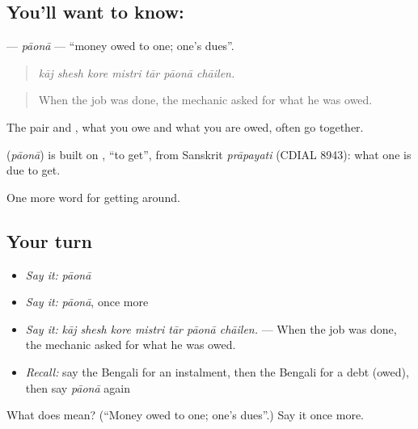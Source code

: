 \subsection*{You'll want to know: }
\textbf{} — \emph{pāonā} — \textquotedblleft{}money owed to one; one's dues\textquotedblright{}.

\begin{quote}
      
\end{quote}

\begin{quote}
\emph{kāj shesh kore mistri tār pāonā chāilen.}
\end{quote}

\begin{quote}
When the job was done, the mechanic asked for what he was owed.
\end{quote}

The pair  and , what you owe and what you are owed, often go together.

\begin{cousinweb}
\textbf{} (\emph{pāonā}) is built on \textbf{}, \textquotedblleft{}to get\textquotedblright{}, from Sanskrit \emph{prāpayati} (CDIAL 8943): what one is due to get.
\end{cousinweb}

\begin{grammarlens}[title={What you've built}]
One more word for getting around.
\end{grammarlens}

\subsection*{Your turn}
\begin{itemize}
\raggedright
  \item \emph{Say it:} \emph{pāonā}
  \item \emph{Say it:} \emph{pāonā}, once more
  \item \emph{Say it:} \emph{kāj shesh kore mistri tār pāonā chāilen.} — When the job was done, the mechanic asked for what he was owed.
  \item \emph{Recall:} say the Bengali for an instalment, then the Bengali for a debt (owed), then say \emph{pāonā} again
\end{itemize}

\begin{tcolorbox}[breakable,colback=teal!4,colframe=teal!35!black,title={Before you move on}]
What does  mean? (\textquotedblleft{}Money owed to one; one's dues\textquotedblright{}.) Say it once more.
\end{tcolorbox}
